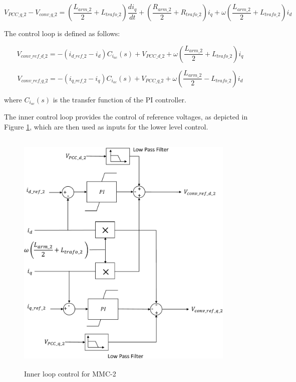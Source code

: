 \begin{equation}
    V_{PCC\_q\_2} - V_{conv\_q\_2} = \left(\frac{L_{arm\_2}}{2} + L_{trafo\_2}\right)\frac{di_{q}}{dt} +\left (\frac{R_{arm\_2}}{2}+R_{trafo\_2}\right)i_q+\omega\left(\frac{L_{arm\_2}}{2}+L_{trafo\_2}\right)i_d
\end{equation}

The control loop is defined as follows:

\begin{equation}
    V_{conv\_ref\_d\_2} = - \left(i_{d\_ref\_2} - i_d\right)C_{i_{ac}}\left(s\right) + V_{PCC\_d\_2} + \omega\left(\frac{L_{arm\_2}}{2}+L_{trafo\_2}\right)i_q
\end{equation}

\begin{equation}
    V_{conv\_ref\_q\_2} = - \left(i_{q\_ref\_2} - i_q\right)C_{i_{ac}}\left(s\right) + V_{PCC\_q\_2} + \omega\left(\frac{L_{arm\_2}}{2}-L_{trafo\_2}\right)i_d
\end{equation}

where $C_{i_{ac}}\left(s\right)$ is the transfer function of the \gls{PI} controller.

The inner control loop provides the control of reference voltages, as depicted in Figure \ref{fig:Inner_control_loop_MMC}, which are then used as inputs for the lower level control.

\begin{figure}[H]
\centering
    \includegraphics[height = 12cm,width = 10.5cm]{Diagrams/Chapter_4/Inner_control_loop_MMC.pdf}
    \caption{Inner loop control for MMC-2 \cite{saad2015modelisation}}
    \label{fig:Inner_control_loop_MMC}
\end{figure}

